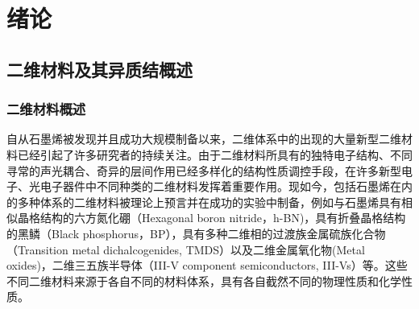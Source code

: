\chapter{绪\hspace{6pt}论}

\section{二维材料及其异质结概述}
\subsection{二维材料概述}
    自从石墨烯被发现并且成功大规模制备以来，二维体系中的出现的大量新型二维材料已经引起了许多研究者的持续关注。由于二维材料所具有的独特电子结构、不同寻常的声光耦合、奇异的层间作用已经多样化的结构性质调控手段，在许多新型电子、光电子器件中不同种类的二维材料发挥着重要作用。现如今，包括石墨烯在内的多种体系的二维材料被理论上预言并在成功的实验中制备，例如与石墨烯具有相似晶格结构的六方氮化硼（Hexagonal boron nitride，h-BN)，具有折叠晶格结构的黑鳞（Black phosphorus，BP），具有多种二维相的过渡族金属硫族化合物（Transition metal dichalcogenides, TMDS）以及二维金属氧化物(Metal oxides)，二维三五族半导体（III-V component semiconductors, III-Vs）等。这些不同二维材料来源于各自不同的材料体系，具有各自截然不同的物理性质和化学性质。%

